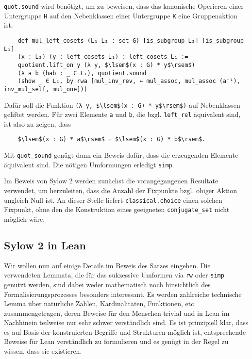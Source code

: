 \documentclass[a4paper,12pt]{scrartcl}
\newcommand{\ls}[1]{\lstinline|#1|}
\begin{document}
	\ls{quot.sound} wird benötigt, um zu beweisen, dass das kanonische Operieren einer Untergruppe \ls{H} auf den Nebenklassen einer Untergruppe \ls{K} eine Gruppenaktion ist:
	\begin{lstlisting}
	def mul_left_cosets (L₁ L₂ : set G) [is_subgroup L₂] [is_subgroup L₁]
	(x : L₂) (y : left_cosets L₁) : left_cosets L₁ :=
	quotient.lift_on y (λ y, $\lsem$(x : G) * y$\rsem$) 
	(λ a b (hab : _ ∈ L₁), quotient.sound 
	(show _ ∈ L₁, by rwa [mul_inv_rev, ← mul_assoc, mul_assoc (a⁻¹), inv_mul_self, mul_one]))
	\end{lstlisting}
	Dafür soll die Funktion \ls{(λ y, $\lsem$(x : G) * y$\rsem$)} auf Nebenklassen geliftet werden. Für zwei Elemente \ls{a} und \ls{b}, die bzgl. \ls{left_rel} äquivalent sind, ist also zu zeigen, dass
	\begin{lstlisting}
	$\lsem$(x : G) * a$\rsem$ = $\lsem$(x : G) * b$\rsem$.
	\end{lstlisting}
	Mit \ls{quot_sound} genügt dann ein Beweis dafür, dass die erzeugenden Elemente äquivalent sind. Die nötigen Umformungen erledigt \ls{simp}.
	
	Im Beweis von Sylow 2 werden zunächst die vorangegangenen Resultate verwendet, um herzuleiten, dass die Anzahl der Fixpunkte bzgl. obiger Aktion ungleich Null ist. An dieser Stelle liefert \ls{classical.choice} einen solchen Fixpunkt, ohne den die Konstruktion eines geeigneten \ls{conjugate_set} nicht möglich wäre.


	\subsection{Sylow 2 in Lean}
	Wir wollen nun auf einige Details im Beweis des Satzes eingehen. Die verwendeten Lemmata, die für das sukzessive Umformen via \ls{rw} oder \ls{simp} genutzt werden, sind dabei weder mathematisch noch hinsichtlich des Formalisierungsprozesses besonders interessant. Es werden zahlreiche technische Lemma über natürliche Zahlen, Kardinalitäten, Funktionen, etc. zusammengetragen, deren Beweise für den Menschen trivial und in Lean im Nachhinein teilweise nur sehr schwer verständlich sind. Es ist prinzipiell klar, dass es auf Basis der konstruierten Begriffe und Strukturen möglich ist, entsprechende Beweise für Lean verständlich zu formulieren und es genügt in der Regel zu wissen, dass sie existieren.
	
\end{document}
